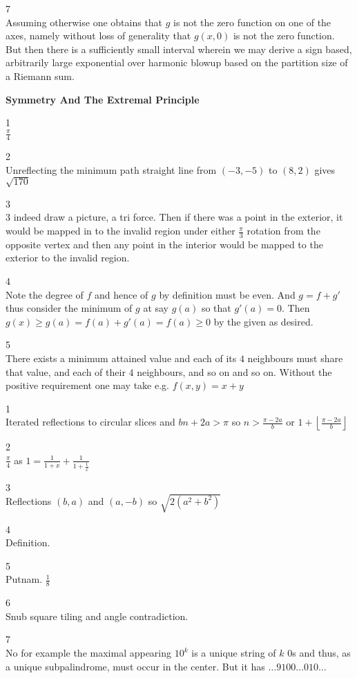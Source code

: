 7 \\
Assuming otherwise one obtains that $g$ is not the zero function on one of the axes, namely without loss of generality that $g(x,0)$ is not the zero function. But then there is a sufficiently small interval wherein we may derive a sign based, arbitrarily large exponential over harmonic blowup based on the partition size of a Riemann sum.

\newpage

\textbf{Symmetry And The Extremal Principle}

1 \\
$\boxed{\frac{\pi}{4}}$

2 \\
Unreflecting the minimum path straight line from $(-3,-5)$ to $(8,2)$ gives $\boxed{\sqrt{170}}$

3 \\
$\boxed{3}$ indeed draw a picture, a tri force. Then if there was a point in the exterior, it would be mapped in to the invalid region under either $\frac{\pi}{3}$ rotation from the opposite vertex and then any point in the interior would be mapped to the exterior to the invalid region.

4 \\
Note the degree of $f$ and hence of $g$ by definition must be even. And $g=f+g'$ thus consider the minimum of $g$ at say $g(a)$ so that $g'(a)=0$. Then $g(x) \ge g(a)=f(a)+g'(a)=f(a) \ge 0$ by the given as desired.

5 \\
There exists a minimum attained value and each of its $4$ neighbours must share that value, and each of their $4$ neighbours, and so on and so on. Without the positive requirement one may take e.g. $f(x,y)=x+y$

1 \\
Iterated reflections to circular slices and $bn+2a>\pi$ so $n > \frac{\pi-2a}{b}$ or $\boxed{1+\left \lfloor \frac{\pi-2a}{b} \right \rfloor}$

2 \\
$\boxed{\frac{\pi}{4}}$ as $1=\frac{1}{1+x}+\frac{1}{1+\frac{1}{x}}$

3 \\
Reflections $(b,a)$ and $(a,-b)$ so $\boxed{\sqrt{2(a^2+b^2)}}$

4 \\
Definition.

5 \\
Putnam. $\boxed{\frac{1}{8}}$

6 \\
Snub square tiling and angle contradiction.

7 \\
No for example the maximal appearing $10^k$ is a unique string of $k$ $0$s and thus, as a unique subpalindrome, must occur in the center. But it has $\dots 9100\dots 010\dots$